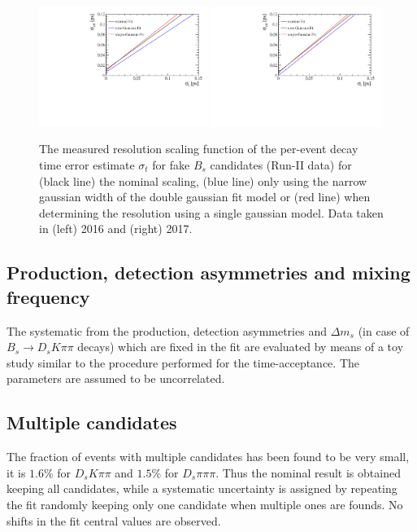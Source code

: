 \begin{figure}[h]
\centering
\includegraphics[height=!,width=0.49\textwidth]{figs/Resolution/ResoSyst_16.pdf}
\includegraphics[height=!,width=0.49\textwidth]{figs/Resolution/ResoSyst_17.pdf}
\caption{\small The measured resolution scaling function of the per-event decay time error estimate $\sigma_t$ for fake $B_s$ candidates (Run-II data) 
for (black line) the nominal scaling, (blue line) only using the narrow gaussian width of the double gaussian fit model or (red line) when determining the resolution using a single gaussian model. 
Data taken in (left) 2016 and (right) 2017.}
\label{fig:SystscaleFactor}
\end{figure}


\subsection{Production, detection asymmetries and mixing frequency}

The systematic from the production, detection asymmetries and $\Delta m_s$ (in case of  $B_s \to D_s K \pi\pi$ decays) which are fixed in the fit
are evaluated by means of a toy study similar to the procedure performed for the time-acceptance. The parameters are assumed to be uncorrelated.

\subsection{Multiple candidates}

The fraction of events with multiple candidates has been found to be very small, it is $1.6\%$ for $D_s K \pi\pi$ and $1.5\%$ for $D_s \pi \pi\pi$. 
Thus the nominal result is obtained keeping all candidates, while a systematic uncertainty is assigned
by repeating the fit randomly keeping only one candidate when multiple ones are founds.
No shifts in the fit central values are observed.

